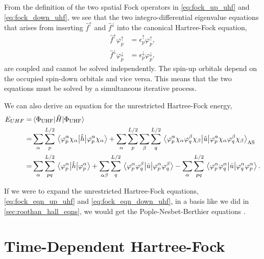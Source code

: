 From the definition of the two spatial Fock operators in \autoref{eq:fock_up_uhf} and 
\autoref{eq:fock_down_uhf},
we see that the two integro-differential eigenvalue equations that arises from inserting
$\hat{f}^\uparrow$ and $\hat{f}^\downarrow$ into the canonical Hartree-Fock equation,
\begin{align}
    \label{eq:fock_eqn_up_uhf}
    \hat{f}^\uparrow \varphi_p^\uparrow &= \epsilon_p^\uparrow\varphi_p^\uparrow, \\
    \label{eq:fock_eqn_down_uhf}
    \hat{f}^\downarrow \varphi_p^\downarrow &= \epsilon_p^\downarrow\varphi_p^\downarrow,
\end{align}
are 
coupled and cannot be solved independently. The spin-up orbitals depend on the occupied spin-down 
orbitals and vice versa. This means that the two equations must be solved by a simultaneous 
iterative process.

We can also derive an equation for the unrestricted Hartree-Fock energy,
\begin{equation}
    \begin{aligned}
    E_{UHF} =& \mel{\Phi_{\text{UHF}}}{\hat{H}}{\Phi_{\text{UHF}}}\\
    =& \sum_\alpha\sum_p^{L/2} \mel{\varphi_p^\alpha\chi_\alpha}{\hat{h}}{\varphi_p^\alpha\chi_\alpha}
    + \sum_\alpha\sum_p^{L/2}\sum_\beta\sum_q^{L/2}
        \mel{\varphi_p^\alpha\chi_\alpha\varphi_q^\beta\chi_\beta}{\hat{u}}
            {\varphi_p^\alpha\chi_\alpha\varphi_q^\beta\chi_\beta}_\text{AS} \\
    =& \sum_\alpha\sum_{pq}^{L/2} \mel{\varphi_p^\alpha}{\hat{h}}{\varphi_p^\alpha} 
    + \sum_{\alpha\beta}\sum_q^{L/2}
        \mel{\varphi_p^\alpha\varphi_q^\beta}{\hat{u}}{\varphi_p^\alpha\varphi_q^\beta} 
    - \sum_\alpha\sum_{pq}^{L/2}
        \mel{\varphi_p^\alpha\varphi_q^\alpha}{\hat{u}}{\varphi_q^\alpha\varphi_p^\alpha}.
    \end{aligned}
\end{equation}

If we were to expand the unrestricted Hartree-Fock equations, \autoref{eq:fock_eqn_up_uhf} and 
\autoref{eq:fock_eqn_down_uhf}, in a basis like we did in \autoref{sec:roothan_hall_eqns}, we 
would get the Pople-Nesbet-Berthier equations \cite{berthier1954extension,pople1954self}.

\section{Time-Dependent Hartree-Fock}

